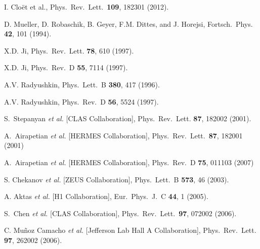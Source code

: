 \documentclass[twocolumn,nofootinbib,showpacs,prl,superscriptaddress,secnumarabic,amssymb,nobibnotes,aps,floatfix]{revtex4}
\begin{document}
\begin{thebibliography}{99}
I. Clo\"et et al., %
Phys.\ Rev.\ Lett.\ {\bf 109}, 182301 (2012).


 D. Mueller, D. Robaschik, B. Geyer, F.M. Dittes, and 
   J.  Horejsi,
Fortsch.\ Phys. {\bf 42}, 101 (1994).
  
X.D. Ji,
Phys.\ Rev.\ Lett. {\bf 78}, 610 (1997).

X.D. Ji,
Phys.\ Rev.\ D {\bf 55}, 7114 (1997).

A.V. Radyushkin,
Phys.\ Lett.\  B {\bf 380}, 417 (1996).

A.V. Radyushkin,
Phys.\ Rev.\ D {\bf 56}, 5524 (1997).

S.~Stepanyan {\it et al.} [CLAS Collaboration],
Phys.\ Rev.\ Lett. {\bf 87}, 182002 (2001).


 A.~Airapetian {\it et al.} [HERMES Collaboration],
 Phys.\ Rev.\ Lett.\  {\bf 87}, 182001 (2001)

 A.~Airapetian {\it et al.} [HERMES Collaboration],
Phys.\ Rev.\ D {\bf 75}, 011103 (2007)



S. Chekanov {\it et al.} [ZEUS Collaboration],
Phys.\ Lett.\  B {\bf 573}, 46 (2003).

A. Aktas {\it et al.} [H1 Collaboration],
Eur.\ Phys.\ J.\ C {\bf 44}, 1 (2005).

S.~Chen {\it et al.} [CLAS Collaboration],
Phys.\ Rev.\ Lett.\ {\bf 97}, 072002 (2006).

C. Mu\~noz Camacho {\it et al.} [Jefferson Lab Hall A Collaboration],
Phys.\ Rev.\ Lett. {\bf 97}, 262002 (2006).


\end{thebibliography}
\end{document}
